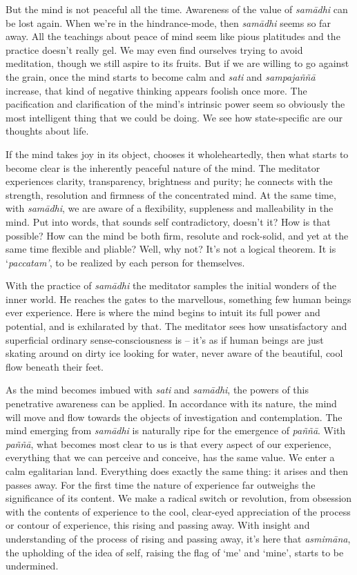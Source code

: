 But the mind is not peaceful all the time. Awareness of the value of
\emph{samādhi} can be lost again. When we're in the hindrance-mode, then
\emph{samādhi} seems so far away. All the teachings about peace of mind
seem like pious platitudes and the practice doesn't really gel. We may
even find ourselves trying to avoid meditation, though we still aspire
to its fruits. But if we are willing to go against the grain, once the
mind starts to become calm and \emph{sati} and \emph{sampajaññā}
increase, that kind of negative thinking appears foolish once more. The
pacification and clarification of the mind's intrinsic power seem so
obviously the most intelligent thing that we could be doing. We see how
state-specific are our thoughts about life.

If the mind takes joy in its object, chooses it wholeheartedly, then
what starts to become clear is the inherently peaceful nature of the
mind. The meditator experiences clarity, transparency, brightness and
purity; he connects with the strength, resolution and firmness of the
concentrated mind. At the same time, with \emph{samādhi}, we are aware
of a flexibility, suppleness and malleability in the mind. Put into
words, that sounds self contradictory, doesn't it? How is that possible?
How can the mind be both firm, resolute and rock-solid, and yet at the
same time flexible and pliable? Well, why not? It's not a logical
theorem. It is `\emph{paccatam'}, to be realized by each person for
themselves.

With the practice of \emph{samādhi} the meditator samples the initial
wonders of the inner world. He reaches the gates to the marvellous,
something few human beings ever experience. Here is where the mind
begins to intuit its full power and potential, and is exhilarated by
that. The meditator sees how unsatisfactory and superficial ordinary
sense-consciousness is -- it's as if human beings are just skating
around on dirty ice looking for water, never aware of the beautiful,
cool flow beneath their feet.

As the mind becomes imbued with \emph{sati} and \emph{samādhi}, the
powers of this penetrative awareness can be applied. In accordance with
its nature, the mind will move and flow towards the objects of
investigation and contemplation. The mind emerging from \emph{samādhi}
is naturally ripe for the emergence of \emph{paññā}. With \emph{paññā},
what becomes most clear to us is that every aspect of our experience,
everything that we can perceive and conceive, has the same value. We
enter a calm egalitarian land. Everything does exactly the same thing:
it arises and then passes away. For the first time the nature of
experience far outweighs the significance of its content. We make a
radical switch or revolution, from obsession with the contents of
experience to the cool, clear-eyed appreciation of the process or
contour of experience, this rising and passing away. With insight and
understanding of the process of rising and passing away, it's here that
\emph{asmimāna}, the upholding of the idea of self, raising the flag of
`me' and `mine', starts to be undermined.

